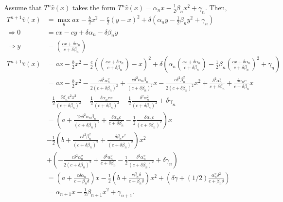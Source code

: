 \documentclass[11pt]{article} %
\begin{document}
Assume that $T^n\hat{v}(x)$ takes the form $T^n\hat{v}(x) = \alpha_n x - \frac{1}{2}\beta_n x^2 + \gamma_n.$ Then,
\begin{align*}
T^{n+1}\hat{v} (x) &= \max_y ax - \frac{b}{2}x^2 - \frac{c}{2}(y-x)^2 + \delta (\alpha_n y - \frac{1}{2}\beta_n y^2 + \gamma_n)\\
\Rightarrow 0 &= cx - cy + \delta \alpha_n - \delta \beta_n y \\
\Rightarrow y &= \left(\frac{cx + \delta \alpha_n}{c+\delta \beta_n}\right)\\
T^{n+1}\hat{v} (x) &= ax - \frac{b}{2}x^2 - \frac{c}{2}\left( \left(\frac{cx + \delta \alpha_n}{c+\delta \beta_n}\right)-x\right)^2 + \delta \left(\alpha_n  \left(\frac{cx + \delta \alpha_n}{c+\delta \beta_n}\right) - \frac{1}{2}\beta_n  \left(\frac{cx + \delta \alpha_n}{c+\delta \beta_n}\right)^2 + \gamma_n\right)\\
&=  ax - \frac{b}{2}x^2 - \frac{c \delta^2 \alpha_n^2}{2(c+\delta \beta_n)^2} +\frac{c\delta^2\alpha_n \beta_n}{(c+\delta \beta_n)^2}x - \frac{c \delta^2 \beta_n^2}{2(c+\delta \beta_n)^2}x^2  + \frac{\delta^2 \alpha_n^2}{c+\delta \beta_n} + \frac{ \delta \alpha_n c }{c+\delta \beta_n}x \\ &- \frac{1}{2}\frac{\delta \beta_n c^2x^2}{(c+\delta \beta_n)^2} -  \frac{1}{2}\frac{\delta \alpha_n c x}{(c+\delta \beta_n)^2} - \frac{1}{2}\frac{\delta^2 \alpha_n^2}{(c+\delta \beta_n)^2}+ \delta \gamma_n \\
&= \left( a + \frac{2c\delta^2\alpha_n \beta_n}{(c+\delta \beta_n)^2}  + \frac{ \delta \alpha_n c }{c+\delta \beta_n}  -  \frac{1}{2}\frac{\delta \alpha_n c}{(c+\delta \beta_n)^2}\right) x \\
&- \frac{1}{2}\left( b +  \frac{c \delta^2 \beta_n^2}{(c+\delta \beta_n)^2} + \frac{\delta \beta_n c^2}{(c+\delta \beta_n)^2} \right) x^2 \\
&+\left( - \frac{c \delta^2 \alpha_n^2}{2(c+\delta \beta_n)^2} + \frac{\delta^2 \alpha_n^2}{c+\delta \beta_n} - \frac{1}{2}\frac{\delta^2 \alpha_n^2}{(c+\delta \beta_n)^2}+ \delta\gamma_n\right)\\
&= \left(a +\frac{c \delta \alpha_n}{c+ \beta_n \delta} \right) x - \frac{1}{2} \left( b + \frac{c \beta_n \delta }{c+ \beta_n \delta} \right)x^2 + \left( \delta \gamma + (1/2)\frac{\alpha_n^2 \delta^2}{c+\beta_n \delta} \right) \\
&=\alpha_{n+1} x -\frac{1}{2}\beta_{n+1}x^2 + \gamma_{n+1}.
\end{align*}
\end{document}
